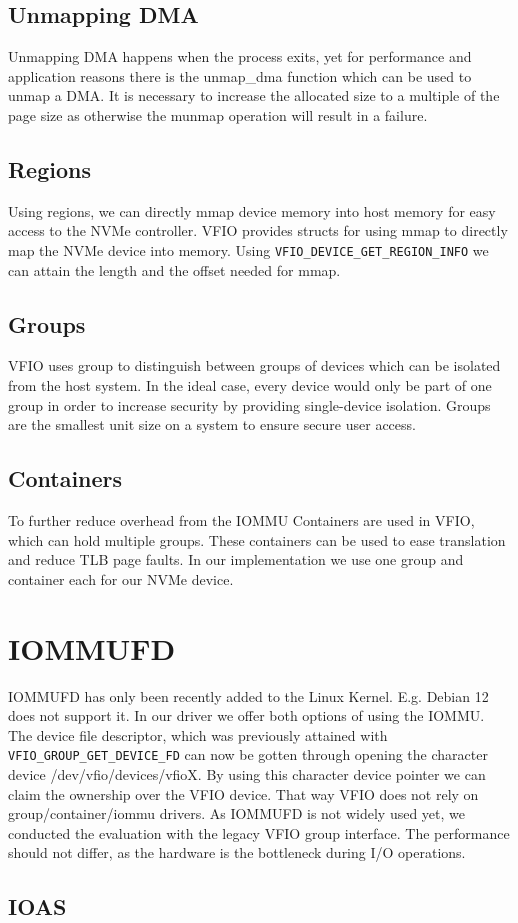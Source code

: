 \subsection{Unmapping DMA}
Unmapping DMA happens when the process exits, yet for performance and application reasons there is the unmap\_dma function which can be used to unmap a DMA. It is necessary to increase the allocated size to a multiple of the page size as otherwise the munmap operation will result in a failure.

\subsection{Regions}
Using regions, we can directly mmap device memory into host memory for easy access to the NVMe controller.
VFIO provides structs for using mmap to directly map the NVMe device into memory. Using \texttt{VFIO\_DEVICE\_GET\_REGION\_INFO} we can attain the length and the offset needed for mmap.

\subsection{Groups}
VFIO uses group to distinguish between groups of devices which can be isolated from the host system. In the ideal case, every device would only be part of one group in order to increase security by providing single-device isolation. Groups are the smallest unit size on a system to ensure secure user access.

\subsection{Containers}
To further reduce overhead from the IOMMU Containers are used in VFIO, which can hold multiple groups. These containers can be used to ease translation and reduce TLB page faults.
In our implementation we use one group and container each for our NVMe device.

\section{IOMMUFD}
IOMMUFD has only been recently added to the Linux Kernel. E.g. Debian 12 does not support it. In our driver we offer both options of using the IOMMU.
The device file descriptor, which was previously attained with \texttt{VFIO\_GROUP\_GET\_DEVICE\_FD} can now be gotten through opening the character device /dev/vfio/devices/vfioX.
By using this character device pointer we can claim the ownership over the VFIO device. That way VFIO does not rely on group/container/iommu drivers.
As IOMMUFD is not widely used yet, we conducted the evaluation with the legacy VFIO group interface. The performance should not differ, as the hardware is the bottleneck during I/O operations.

\subsection{IOAS}
